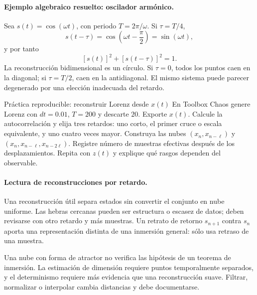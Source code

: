 \paragraph{Ejemplo algebraico resuelto: oscilador armónico.}
Sea \(s(t)=\cos(\omega t)\), con periodo \(T=2\pi/\omega\). Si
\(\tau=T/4\),
\[
 s(t-\tau)=\cos\left(\omega t-\frac{\pi}{2}\right)=\sin(\omega t),
\]
y por tanto
\[
 [s(t)]^2+[s(t-\tau)]^2=1.
\]
La reconstrucción bidimensional es un círculo. Si \(\tau=0\), todos los puntos caen
en la diagonal; si \(\tau=T/2\), caen en la antidiagonal. El mismo sistema puede
parecer degenerado por una elección inadecuada del retardo.

\begin{activitybox}{Práctica reproducible: reconstruir Lorenz desde \(x(t)\)}
En Toolbox Chaos genere Lorenz con \(dt=0.01\), \(T=200\) y descarte \(20\).
Exporte \(x(t)\). Calcule la autocorrelación y elija tres retardos: uno corto, el
primer cruce o escala equivalente, y uno cuatro veces mayor. Construya las nubes
\((x_n,x_{n-\ell})\) y
\((x_n,x_{n-\ell},x_{n-2\ell})\). Registre número de muestras efectivas después de
los desplazamientos. Repita con \(z(t)\) y explique qué rasgos dependen del observable.
\end{activitybox}

\paragraph{Lectura de reconstrucciones por retardo.}
Una reconstrucción útil separa estados sin convertir el conjunto en nube uniforme.
Las hebras cercanas pueden ser estructura o escasez de datos; deben revisarse con otro
retardo y más muestras. Un retrato de retorno \(s_{n+1}\) contra \(s_n\) aporta una representación distinta de
una inmersión general: sólo usa retraso de una muestra.

\begin{warningbox}
Una nube con forma de atractor no verifica las hipótesis de un teorema de inmersión.
La estimación de dimensión requiere puntos temporalmente separados, y el determinismo requiere más evidencia que una reconstrucción suave. Filtrar, normalizar o
interpolar cambia distancias y debe documentarse.
\end{warningbox}


